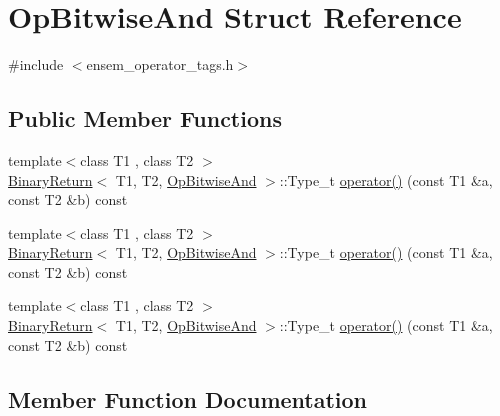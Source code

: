 \hypertarget{structOpBitwiseAnd}{}\section{Op\+Bitwise\+And Struct Reference}
\label{structOpBitwiseAnd}


{\ttfamily \#include $<$ensem\+\_\+operator\+\_\+tags.\+h$>$}

\subsection*{Public Member Functions}
\begin{DoxyCompactItemize}
\item 
{\footnotesize template$<$class T1 , class T2 $>$ }\\\mbox{\hyperlink{structBinaryReturn}{Binary\+Return}}$<$ T1, T2, \mbox{\hyperlink{structOpBitwiseAnd}{Op\+Bitwise\+And}} $>$\+::Type\+\_\+t \mbox{\hyperlink{structOpBitwiseAnd_aa3f0de5d7060f7385f0fb035d16f09d3}{operator()}} (const T1 \&a, const T2 \&b) const
\item 
{\footnotesize template$<$class T1 , class T2 $>$ }\\\mbox{\hyperlink{structBinaryReturn}{Binary\+Return}}$<$ T1, T2, \mbox{\hyperlink{structOpBitwiseAnd}{Op\+Bitwise\+And}} $>$\+::Type\+\_\+t \mbox{\hyperlink{structOpBitwiseAnd_aa3f0de5d7060f7385f0fb035d16f09d3}{operator()}} (const T1 \&a, const T2 \&b) const
\item 
{\footnotesize template$<$class T1 , class T2 $>$ }\\\mbox{\hyperlink{structBinaryReturn}{Binary\+Return}}$<$ T1, T2, \mbox{\hyperlink{structOpBitwiseAnd}{Op\+Bitwise\+And}} $>$\+::Type\+\_\+t \mbox{\hyperlink{structOpBitwiseAnd_aa3f0de5d7060f7385f0fb035d16f09d3}{operator()}} (const T1 \&a, const T2 \&b) const
\end{DoxyCompactItemize}


\subsection{Member Function Documentation}
\mbox{\label{structOpBitwiseAnd_aa3f0de5d7060f7385f0fb035d16f09d3}} 
